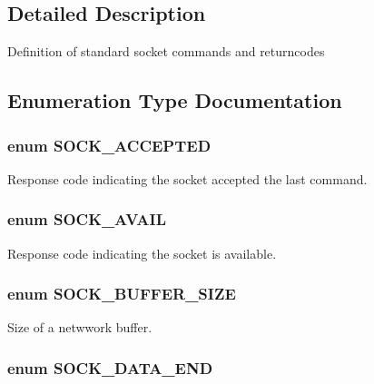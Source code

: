 \subsection{Detailed Description}
Definition of standard socket commands and returncodes 

\subsection{Enumeration Type Documentation}
\subsubsection[{SOCK\_\-ACCEPTED}]{\setlength{\rightskip}{0pt plus 5cm}enum {\bf SOCK\_\-ACCEPTED}}\label{group__SOCKET__Codes_ga70cdc3085a0c0b1d009bb6c6c027f4b7}


Response code indicating the socket accepted the last command. 

\subsubsection[{SOCK\_\-AVAIL}]{\setlength{\rightskip}{0pt plus 5cm}enum {\bf SOCK\_\-AVAIL}}\label{group__SOCKET__Codes_gaccae661aa033b18e7b3a4f0251068054}


Response code indicating the socket is available. 

\subsubsection[{SOCK\_\-BUFFER\_\-SIZE}]{\setlength{\rightskip}{0pt plus 5cm}enum {\bf SOCK\_\-BUFFER\_\-SIZE}}\label{group__SOCKET__Codes_gaddf6a3bfe9c4b3ea5fb4465b4995462c}


Size of a netwwork buffer. 

\subsubsection[{SOCK\_\-DATA\_\-END}]{\setlength{\rightskip}{0pt plus 5cm}enum {\bf SOCK\_\-DATA\_\-END}}\label{group__SOCKET__Codes_ga1b2328e5842c10f2935d484c09b2e276}


